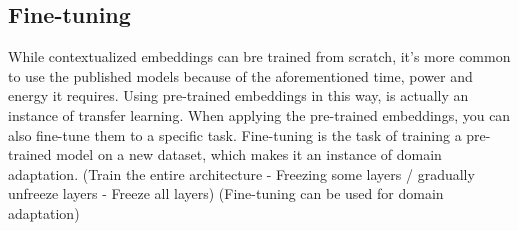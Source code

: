 \documentclass{report}
\begin{document}
\subsection{Fine-tuning}
While contextualized embeddings can bre trained from scratch, it's more common to use the published models because of the aforementioned time, power and energy it requires. Using pre-trained embeddings in this way, is actually an instance of transfer learning. When applying the pre-trained embeddings, you can also fine-tune them to a specific task. Fine-tuning is the task of training a pre-trained model on a new dataset, which makes it an instance of domain adaptation. (Train the entire architecture - Freezing some layers / gradually unfreeze layers - Freeze all layers) (Fine-tuning can be used for domain adaptation)






\newpage


\end{document}
